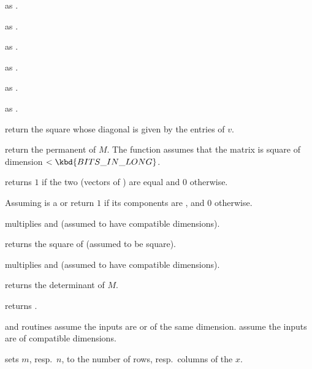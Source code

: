  as .

 as .

 as .

 as .

 as .

 as .

 return the square  whose diagonal
is given by the entries of $v$.

 return the permanent of $M$.
The function assumes that the matrix is square of dimension
$< \kbd{BITS\_IN\_LONG}$.

 returns $1$ if the two  (vectors
of ) are equal and $0$ otherwise.


 Assuming  is a 
or  return $1$ if its components are , and $0$ otherwise.





 multiplies  and  (assumed to
have compatible dimensions).

 returns the square of  (assumed to be square).

 multiplies  and  (assumed to
have compatible dimensions).

 returns the determinant of $M$.

 returns .


 and  routines assume the inputs are  or 
of the same dimension.  assume the inputs are  of
compatible dimensions.


 sets $m$, resp.~$n$, to
the number of rows, resp.~columns of the  $x$.

